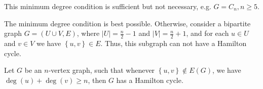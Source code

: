 \begin{remark}
    This minimum degree condition is sufficient but not necessary, e.g. \(G = C_n, n \ge 5\). 
\end{remark}

\begin{remark}
    The minimum degree condition is best possible. Otherwise, consider a bipartite graph \(G = (U \cup V, E)\), where \(\vert U \vert = \frac{n}{2} - 1 \) and \(\vert V \vert = \frac{n}{2} + 1 \), and for each \(u \in U\) and \(v \in V\) we have \(\left\{ u, v \right\} \in E \). Thus, this subgraph can not have a Hamilton cycle.         
\end{remark}

\begin{theorem}[Ore]
    Let \(G\) be an \(n\)-vertex graph, such that whenever \(\left\{ u, v \right\} \notin E(G) \), we have \(\deg(u) + \deg(v) \ge n\), then \(G\) has a Hamilton cycle.   
\end{theorem}